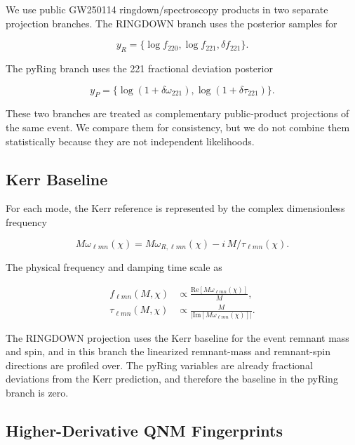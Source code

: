 \documentclass[aps,prd,10pt,twocolumn,nofootinbib,superscriptaddress]{revtex4-2}
\begin{document}
We use public GW250114 ringdown/spectroscopy products in two separate
projection branches. The RINGDOWN branch uses the posterior samples for

\begin{equation}
y_R=\{\log f_{220},\log f_{221},\delta f_{221}\}.
\end{equation}

The pyRing branch uses the 221 fractional deviation posterior

\begin{equation}
y_P=\{\log(1+\delta\omega_{221}),\log(1+\delta\tau_{221})\}.
\end{equation}

These two branches are treated as complementary public-product projections of
the same event. We compare them for consistency, but we do not combine them
statistically because they are not independent likelihoods.

\subsection{Kerr Baseline}

For each mode, the Kerr reference is represented by the complex dimensionless
frequency \cite{Ber-Car-Wil:2006:PRD:,Ste:2019:JOSS:}

\begin{equation}
M\omega_{\ell mn}(\chi)=M\omega_{R,\ell mn}(\chi)-i\,M/\tau_{\ell mn}(\chi).
\end{equation}

The physical frequency and damping time scale as

\begin{align}
f_{\ell mn}(M,\chi)&\propto \frac{\mathrm{Re}[M\omega_{\ell mn}(\chi)]}{M},\\
\tau_{\ell mn}(M,\chi)&\propto \frac{M}{|\mathrm{Im}[M\omega_{\ell mn}(\chi)]|}.
\end{align}

The RINGDOWN projection uses the Kerr baseline for the event remnant mass and
spin, and in this branch the linearized remnant-mass and remnant-spin
directions are profiled over. The pyRing variables are already fractional
deviations from the Kerr prediction, and therefore the baseline in the pyRing
branch is zero.

\subsection{Higher-Derivative QNM Fingerprints}
\end{document}
